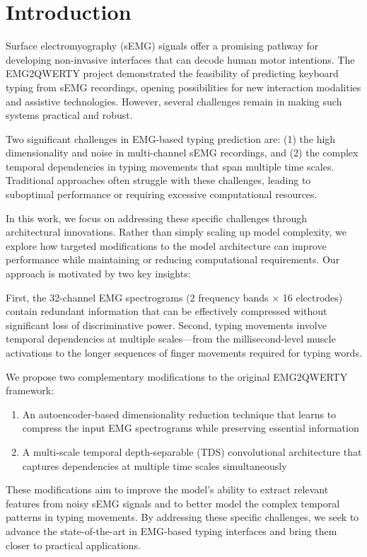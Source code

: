 \section{Introduction}

Surface electromyography (sEMG) signals offer a promising pathway for developing non-invasive interfaces that can decode human motor intentions. The EMG2QWERTY project demonstrated the feasibility of predicting keyboard typing from sEMG recordings, opening possibilities for new interaction modalities and assistive technologies. However, several challenges remain in making such systems practical and robust.

Two significant challenges in EMG-based typing prediction are: (1) the high dimensionality and noise in multi-channel sEMG recordings, and (2) the complex temporal dependencies in typing movements that span multiple time scales. Traditional approaches often struggle with these challenges, leading to suboptimal performance or requiring excessive computational resources.

In this work, we focus on addressing these specific challenges through architectural innovations. Rather than simply scaling up model complexity, we explore how targeted modifications to the model architecture can improve performance while maintaining or reducing computational requirements. Our approach is motivated by two key insights:

First, the 32-channel EMG spectrograms (2 frequency bands × 16 electrodes) contain redundant information that can be effectively compressed without significant loss of discriminative power. Second, typing movements involve temporal dependencies at multiple scales—from the millisecond-level muscle activations to the longer sequences of finger movements required for typing words.

We propose two complementary modifications to the original EMG2QWERTY framework:
\begin{enumerate}
    \item An autoencoder-based dimensionality reduction technique that learns to compress the input EMG spectrograms while preserving essential information
    \item A multi-scale temporal depth-separable (TDS) convolutional architecture that captures dependencies at multiple time scales simultaneously
\end{enumerate}

These modifications aim to improve the model's ability to extract relevant features from noisy sEMG signals and to better model the complex temporal patterns in typing movements. By addressing these specific challenges, we seek to advance the state-of-the-art in EMG-based typing interfaces and bring them closer to practical applications. 